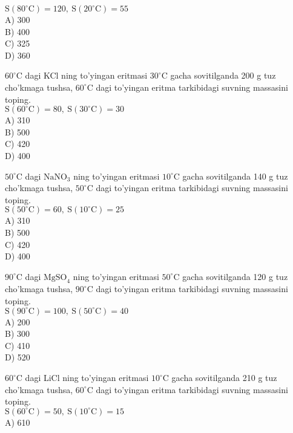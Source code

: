 $\mathrm{S}\left(80^{\circ} \mathrm{C}\right)=120, \mathrm{~S}\left(20^{\circ} \mathrm{C}\right)=55$\\
A) 300\\
B) 400\\
C) 325\\
D) 360
  \item $60^{\circ} \mathrm{C}$ dagi KCl ning to'yingan eritmasi $30^{\circ} \mathrm{C}$ gacha sovitilganda 200 g tuz cho'kmaga tushsa, $60^{\circ} \mathrm{C}$ dagi to'yingan eritma tarkibidagi suvning massasini toping.\\
$\mathrm{S}\left(60^{\circ} \mathrm{C}\right)=80, \mathrm{~S}\left(30^{\circ} \mathrm{C}\right)=30$\\
A) 310\\
B) 500\\
C) 420\\
D) 400
  \item $50^{\circ} \mathrm{C}$ dagi $\mathrm{NaNO}_{3}$ ning to'yingan eritmasi $10^{\circ} \mathrm{C}$ gacha sovitilganda 140 g tuz cho'kmaga tushsa, $50^{\circ} \mathrm{C}$ dagi to'yingan eritma tarkibidagi suvning massasini toping.\\
$\mathrm{S}\left(50^{\circ} \mathrm{C}\right)=60, \mathrm{~S}\left(10^{\circ} \mathrm{C}\right)=25$\\
A) 310\\
B) 500\\
C) 420\\
D) 400
  \item $90^{\circ} \mathrm{C}$ dagi $\mathrm{MgSO}_{4}$ ning to'yingan eritmasi $50^{\circ} \mathrm{C}$ gacha sovitilganda 120 g tuz cho'kmaga tushsa, $90^{\circ} \mathrm{C}$ dagi to'yingan eritma tarkibidagi suvning massasini toping.\\
$\mathrm{S}\left(90^{\circ} \mathrm{C}\right)=100, \mathrm{~S}\left(50^{\circ} \mathrm{C}\right)=40$\\
A) 200\\
B) 300\\
C) 410\\
D) 520
  \item $60^{\circ} \mathrm{C}$ dagi LiCl ning to'yingan eritmasi $10^{\circ} \mathrm{C}$ gacha sovitilganda 210 g tuz cho'kmaga tushsa, $60^{\circ} \mathrm{C}$ dagi to'yingan eritma tarkibidagi suvning massasini toping.\\
$\mathrm{S}\left(60^{\circ} \mathrm{C}\right)=50, \mathrm{~S}\left(10^{\circ} \mathrm{C}\right)=15$\\
A) 610\\
